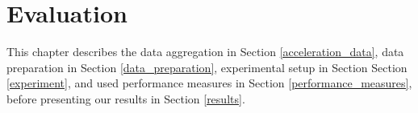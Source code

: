 \section{Evaluation} \label{evaluation}

This chapter describes the data aggregation in Section \ref{acceleration_data}, data preparation in Section \ref{data_preparation}, experimental setup in Section Section \ref{experiment}, and used performance measures in Section \ref{performance_measures}, before presenting our results in Section \ref{results}.







